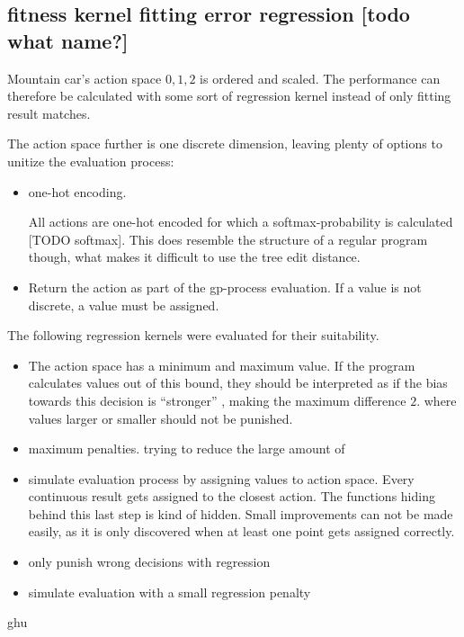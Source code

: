 \subsection{fitness kernel fitting error regression [todo what name?]}

Mountain car's action space ${0, 1, 2}$ is ordered and scaled. The performance can therefore be calculated with some sort of regression kernel instead of only fitting result matches.

The action space further is one discrete dimension, leaving plenty of options to unitize the evaluation process:

\begin{itemize}
    \item one-hot encoding.
    
    All actions are one-hot encoded for which a softmax-probability is calculated [TODO softmax]. This does resemble the structure of a regular program though, what makes it difficult to use the tree edit distance.
    
    \item Return the action as part of the gp-process evaluation. If a value is not discrete, a value must be assigned.
\end{itemize}

The following regression kernels were evaluated for their suitability.
\begin{itemize}
    
    \item The action space has a minimum and maximum value. If the program calculates values out of this bound, they should be interpreted as if the bias towards this decision is ``stronger'' , making the maximum difference $2$.  where values larger or smaller should not be punished.
    \item maximum penalties. trying to reduce the large amount of 
    \item simulate evaluation process by assigning values to action space. Every continuous result gets assigned to the closest action. The functions hiding behind this last step is kind of hidden. Small improvements can not be made easily, as it is only discovered when at least one point gets assigned correctly.
    \item only punish wrong decisions with regression
    \item simulate evaluation with a small regression penalty
\end{itemize}
ghu

